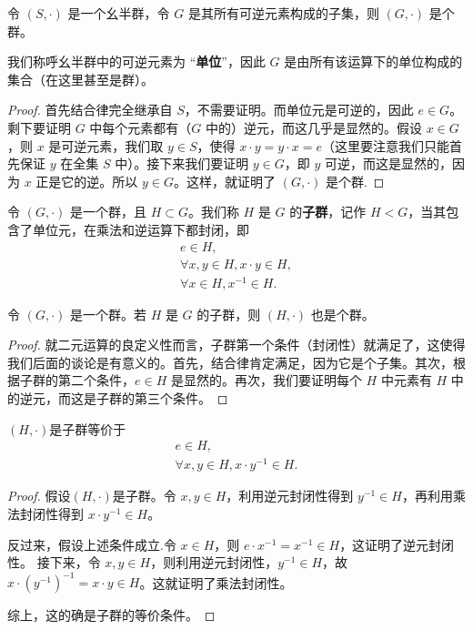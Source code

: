 \documentclass[../../main.tex]{subfiles}
\begin{document}
\begin{lemma}
令 $(S, \cdot)$ 是一个幺半群，令 $G$ 是其所有可逆元素构成的子集，则 $(G, \cdot)$ 是个群。
\end{lemma}
\begin{remark}
我们称呼幺半群中的可逆元素为 “\textbf{单位}”，因此 $G$ 是由所有该运算下的单位构成的集合（在这里甚至是群）。
\end{remark}
\begin{proof}
首先结合律完全继承自 $S$，不需要证明。而单位元是可逆的，因此 $e \in G$。剩下要证明 $G$ 中每个元素都有（$G$ 中的）逆元，而这几乎是显然的。假设 $x \in G$，则 $x$ 是可逆元素，我们取 $y \in S$，使得 $x \cdot y = y \cdot x = e$（这里要注意我们只能首先保证 $y$ 在全集 $S$ 中）。接下来我们要证明 $y \in G$，即 $y$ 可逆，而这是显然的，因为 $x$ 正是它的逆。所以 $y \in G$。这样，就证明了 $(G, \cdot)$ 是个群.
\end{proof}

\begin{definition}[子群]
令 $(G, \cdot)$ 是一个群，且 $H \subset G$。我们称 $H$ 是 $G$ 的\textbf{子群}，记作 $H < G$，当其包含了单位元，在乘法和逆运算下都封闭，即
\begin{gather*}
e \in H ,\\
\forall x, y \in H, x \cdot y \in H ,\\
\forall x \in H, x^{-1} \in H.
\end{gather*} 
\end{definition}

\begin{proposition}[子群也是群]
令 $(G, \cdot)$ 是一个群。若 $H$ 是 $G$ 的子群，则 $(H, \cdot)$ 也是个群。
\end{proposition}
\begin{proof}
就二元运算的良定义性而言，子群第一个条件（封闭性）就满足了，这使得我们后面的谈论是有意义的。首先，结合律肯定满足，因为它是个子集。其次，根据子群的第二个条件，$e \in H$ 是显然的。再次，我们要证明每个 $H$ 中元素有 $H$ 中的逆元，而这是子群的第三个条件。
\end{proof}

\begin{proposition}[子群的等价条件]\label{proposition:子群的等价条件}
$(H,\cdot)$是子群等价于
\begin{gather*}
e \in H,\\
\forall x, y \in H, x \cdot y^{-1} \in H .
\end{gather*}
\end{proposition}
\begin{proof}
假设$(H,\cdot)$是子群。令 $x, y \in H$，利用逆元封闭性得到 $y^{-1} \in H$，再利用乘法封闭性得到 $x \cdot y^{-1} \in H$。

反过来，假设上述条件成立.令 $x \in H$，则 $e \cdot x^{-1} = x^{-1} \in H$，这证明了逆元封闭性。
接下来，令 $x, y \in H$，则利用逆元封闭性，$y^{-1} \in H$，故 $x \cdot (y^{-1})^{-1} = x \cdot y \in H$。这就证明了乘法封闭性。

综上，这的确是子群的等价条件。
\end{proof}
\end{document}
